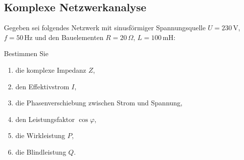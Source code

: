\documentclass[a4paper,12pt]{article}
\newif\ifshowsolutions
\begin{document}
\ifshowsolutions
Lösung:
\[
\underline{Z}_R = R
\]
\[
\underline{Z}_L = j \omega L = j \cdot 1000 \cdot 0.05 = j50\,\Omega
\]
\[
\underline{Z}_C = \frac{1}{j \omega C} = \frac{1}{j \cdot 1000 \cdot 100 \cdot 10^{-6}} = -j10\,\Omega
\]
\[
\underline{Z}_{LC} = \left( \frac{1}{Z_L} + \frac{1}{Z_C} \right)^{-1} = \frac{1}{j0.08} = -j12.5\,\Omega
\]
\[
\underline{Z} = R_1 + Z_{LC} + R_2 = (30 - j12.5)\,\Omega
\]
\[
|\underline{Z}| = \sqrt{30^2 + 12.5^2} \approx 32.5\,\Omega
\]
\[
\varphi = \arctan\left(\frac{-12.5}{30}\right) \approx -22.6^\circ
\]
\fi

\subsection{Komplexe Netzwerkanalyse}

Gegeben sei folgendes Netzwerk mit sinusförmiger Spannungsquelle $U = 230\,\mathrm{V}$, $f = 50\,\mathrm{Hz}$ und den Bauelementen $R = 20\,\Omega$, $L = 100\,\mathrm{mH}$:

\begin{center}
\end{center}

Bestimmen Sie

\begin{enumerate}
  \item die komplexe Impedanz $Z$,
  \item den Effektivstrom $I$,
  \item die Phasenverschiebung zwischen Strom und Spannung,
  \item den Leistungsfaktor $\cos\varphi$,
  \item die Wirkleistung $P$,
  \item die Blindleistung $Q$.
\end{enumerate}

\ifshowsolutions
Lösung:
\[
\omega = 2\pi f = 314\,\text{rad/s}
\]
\[
X_L = \omega L = 31.4\,\Omega
\]
\[
\underline{Z} = (20 + j31.4)\,\Omega \Rightarrow |\underline{Z}| = 37.2\,\Omega
\]
\[
I = \frac{230}{37.2} = 6.18\,\text{A}
\]
\[
\varphi = \arctan\left(\frac{31.4}{20}\right) = 57.5^\circ
\]
\[
\cos\varphi = 0.54
\]
\[
P = U I \cos\varphi = 764\,\text{W}
\]
\[
Q = U I \sin\varphi = 1199\,\text{VAR}
\]
\fi
\end{document}
